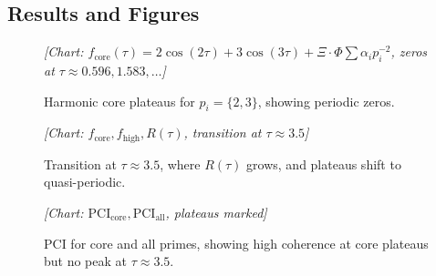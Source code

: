 \documentclass{article}
\theoremstyle{plain}
\begin{document}
\subsection{Results and Figures}
\begin{figure}[h]
    \centering
    \caption{Harmonic core plateaus for \( p_i = \{2, 3\} \), showing periodic zeros.}
    \label{fig:core}
    \textit{[Chart: \( f_{\text{core}}(\tau) = 2 \cos(2\tau) + 3 \cos(3\tau) + \Xi \cdot \Phi \sum \alpha_i p_i^{-2} \), zeros at \( \tau \approx 0.596, 1.583, \ldots \)]}
\end{figure}

\begin{figure}[h]
    \centering
    \caption{Transition at \( \tau \approx 3.5 \), where \( R(\tau) \) grows, and plateaus shift to quasi-periodic.}
    \label{fig:transition}
    \textit{[Chart: \( f_{\text{core}}, f_{\text{high}}, R(\tau) \), transition at \( \tau \approx 3.5 \)]}
\end{figure}

\begin{figure}[h]
    \centering
    \caption{PCI for core and all primes, showing high coherence at core plateaus but no peak at \( \tau \approx 3.5 \).}
    \label{fig:pci}
    \textit{[Chart: \( \text{PCI}_{\text{core}}, \text{PCI}_{\text{all}} \), plateaus marked]}
\end{figure}
\end{document}
